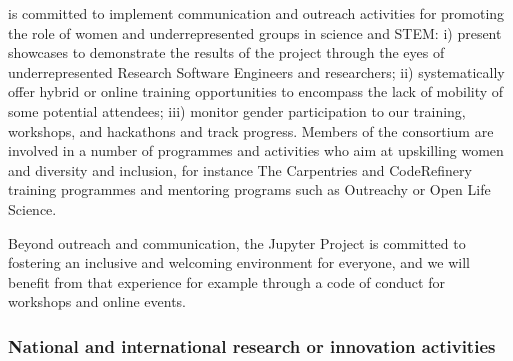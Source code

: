 



\TheProject is committed to implement communication and outreach activities for
promoting the role of women and underrepresented groups in science
and STEM: i) present showcases to demonstrate the results of the project through
the eyes of underrepresented Research Software Engineers and researchers; ii)
systematically offer hybrid or online training opportunities to encompass the
lack of mobility of some potential attendees; iii) monitor gender participation
to our training, workshops, and hackathons and track progress. Members of the
consortium are involved in a number of programmes and activities who aim at
upskilling women and diversity and inclusion, for instance The Carpentries and
CodeRefinery training programmes and mentoring programs such as Outreachy or
Open Life Science.

Beyond outreach and communication, the Jupyter Project is committed to fostering an
inclusive and welcoming environment for everyone, and we will benefit from that
experience for example through a code of conduct for workshops and online events.

\subsubsection{National and international research or innovation activities}


